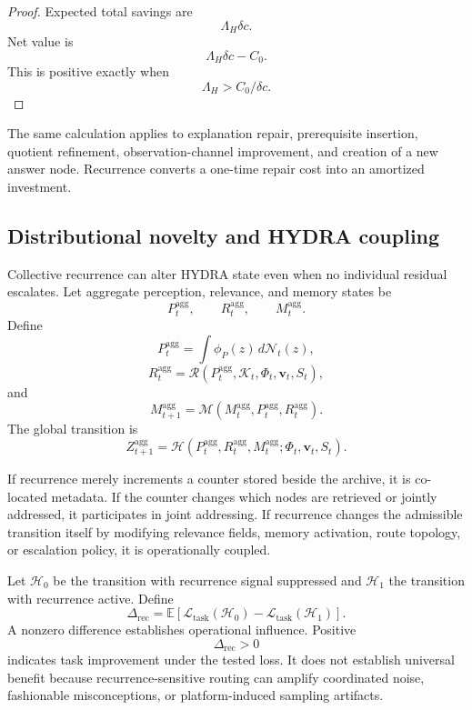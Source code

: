 \documentclass[11pt]{article}
\theoremstyle{definition}
\newcommand{\E}{\mathbb{E}}
\newcommand{\K}{\mathcal{K}}
\newcommand{\FieldPhi}{\Phi}
\newcommand{\FieldV}{\mathbf{v}}
\newcommand{\FieldS}{S}
\begin{document}
\begin{proof}
Expected total savings are
\[
\Lambda_H\delta c.
\]
Net value is
\[
\Lambda_H\delta c-C_0.
\]
This is positive exactly when
\[
\Lambda_H>C_0/\delta c.
\]
\end{proof}

The same calculation applies to explanation repair, prerequisite insertion, quotient refinement, observation-channel improvement, and creation of a new answer node. Recurrence converts a one-time repair cost into an amortized investment.

\subsection{Distributional novelty and HYDRA coupling}

Collective recurrence can alter HYDRA state even when no individual residual escalates. Let aggregate perception, relevance, and memory states be
\[
P_t^{\mathrm{agg}},
\qquad
R_t^{\mathrm{agg}},
\qquad
M_t^{\mathrm{agg}}.
\]
Define
\[
P_t^{\mathrm{agg}}
=
\int
\phi_P(z)\,d\mathcal{N}_t(z),
\]
\[
R_t^{\mathrm{agg}}
=
\mathcal{R}\!\left(
P_t^{\mathrm{agg}},
\K_t,
\FieldPhi_t,
\FieldV_t,
\FieldS_t
\right),
\]
and
\[
M_{t+1}^{\mathrm{agg}}
=
\mathcal{M}\!\left(
M_t^{\mathrm{agg}},
P_t^{\mathrm{agg}},
R_t^{\mathrm{agg}}
\right).
\]
The global transition is
\[
Z_{t+1}^{\mathrm{agg}}
=
\mathcal{H}\!\left(
P_t^{\mathrm{agg}},
R_t^{\mathrm{agg}},
M_t^{\mathrm{agg}};
\FieldPhi_t,
\FieldV_t,
\FieldS_t
\right).
\]

If recurrence merely increments a counter stored beside the archive, it is co-located metadata. If the counter changes which nodes are retrieved or jointly addressed, it participates in joint addressing. If recurrence changes the admissible transition itself by modifying relevance fields, memory activation, route topology, or escalation policy, it is operationally coupled.

Let \(\mathcal{H}_0\) be the transition with recurrence signal suppressed and \(\mathcal{H}_1\) the transition with recurrence active. Define
\[
\Delta_{\mathrm{rec}}
=
\E\!\left[
\mathcal{L}_{\mathrm{task}}(\mathcal{H}_0)
-
\mathcal{L}_{\mathrm{task}}(\mathcal{H}_1)
\right].
\]
A nonzero difference establishes operational influence. Positive
\[
\Delta_{\mathrm{rec}}>0
\]
indicates task improvement under the tested loss. It does not establish universal benefit because recurrence-sensitive routing can amplify coordinated noise, fashionable misconceptions, or platform-induced sampling artifacts.
\end{document}
